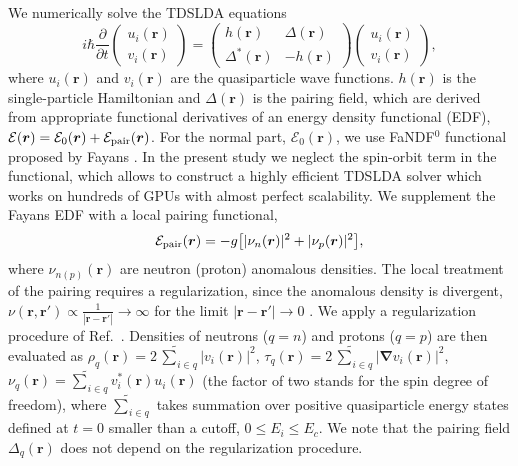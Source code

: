 \documentclass{PoS}
\def\bs#1{\boldsymbol{#1}}
\begin{document}
We numerically solve the TDSLDA equations
\begin{equation}
i\hbar\frac{\partial}{\partial t}
\begin{pmatrix}
u_i(\bs{r})\\
v_i(\bs{r})
\end{pmatrix}
=
\begin{pmatrix}
h(\bs{r})              & \Delta(\bs{r}) \\
\Delta^*(\bs{r}) & -h(\bs{r})
\end{pmatrix}
\begin{pmatrix}
u_i(\bs{r})\\
v_i(\bs{r})
\end{pmatrix},
\end{equation}
where $u_i(\bs{r})$ and $v_i(\bs{r})$ are the quasiparticle wave functions.
$h(\bs{r})$ is the single-particle Hamiltonian and $\Delta(\bs{r})$ is the pairing
field, which are derived from appropriate functional derivatives of an energy density
functional (EDF), $\mathcal{E}(\bs{r})=\mathcal{E}_0(\bs{r})+\mathcal{E}_{\rm pair}(\bs{r})$.
For the normal part, $\mathcal{E}_0(\bs{r})$, we use FaNDF$^0$ functional proposed
by Fayans \cite{Fayans}. In the present study we neglect the spin-orbit term in the
functional, which allows to construct a highly efficient TDSLDA solver \cite{vortex}
which works on hundreds of GPUs with almost perfect scalability. We supplement
the Fayans EDF with a local pairing functional,
\begin{equation}
\mathcal{E}_{\rm pair}(\bs{r})=-g\bigl[ |\nu_n(\bs{r})|^2 + |\nu_p(\bs{r})|^2 \bigr],
\end{equation}
where $\nu_{n(p)}(\bs{r})$ are neutron (proton) anomalous densities.
The local treatment of the pairing requires a regularization, since the
anomalous density is divergent, $\nu(\bs{r},\bs{r}') \propto
\frac{1}{|\bs{r}-\bs{r}'|}\rightarrow\infty$ for the limit $|\bs{r}-\bs{r}'|
\rightarrow 0$ \cite{Bulgac(2001)}. We apply a regularization procedure
of Ref.~\cite{Bulgac(2002)2}. Densities of neutrons ($q=n$) and protons
($q=p$) are then evaluated as
$\rho_q(\bs{r})=2\,\tilde{\sum}_{i\in q}|v_i(\bs{r})|^2$,
$\tau_q(\bs{r})=2\,\tilde{\sum}_{i\in q}|\bs{\nabla}v_i(\bs{r})|^2$,
$\nu_q(\bs{r})=\tilde{\sum}_{i\in q} v_i^*(\bs{r})u_i(\bs{r})$ 
(the factor of two stands for the spin degree of freedom), where $\tilde{\sum}_{i\in q}$
takes summation over positive quasiparticle energy states defined at $t=0$ smaller
than a cutoff, $0 \le E_i \le E_c$. We note that the pairing field $\Delta_q(\bs{r})$
does not depend on the regularization procedure.
\end{document}
